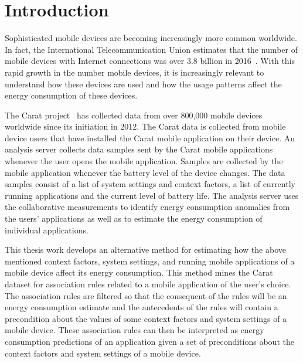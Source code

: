 \section{Introduction}


Sophisticated mobile devices are becoming increasingly more common worldwide. In fact, the International Telecommunication Union estimates that the number of mobile devices with Internet connections was over 3.8 billion in 2016~\cite{ITUstats}. With this rapid growth in the number mobile devices, it is increasingly relevant to understand how these devices are used and how the usage patterns affect the energy consumption of these devices.    

The Carat project~\cite{Oliner:2012:CED:2387858.2387864, Oliner:2013:CCE:2517351.2517354, 7840871, PELTONEN201671, 7146507} has collected data from over 800,000 mobile devices worldwide since its initiation in 2012. The Carat data is collected from mobile device users that have installed the Carat mobile application on their device. An analysis server collects data samples sent by the Carat mobile applications whenever the user opens the mobile application. Samples are collected by the mobile application whenever the battery level of the device changes. The data samples consist of a list of system settings and context factors, a list of currently running applications and the current level of battery life. The analysis server uses the collaborative measurements to identify energy consumption anomalies from the users' applications as well as to estimate the energy consumption of individual applications.

This thesis work develops an alternative method for estimating how the above mentioned context factors, system settings, and running mobile applications of a mobile device affect its energy consumption. This method mines the Carat dataset for association rules related to a mobile application of the user's choice. The association rules are filtered so that the consequent of the rules will be an energy consumption estimate and the antecedents of the rules will contain a precondition about the values of some context factors and system settings of a mobile device. These association rules can then be interpreted as energy consumption predictions of an application given a set of preconditions about the context factors and system settings of a mobile device.      

